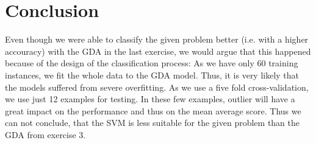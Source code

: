 \documentclass[a4paper,parskip=half-]{scrartcl}
\begin{document}
	\section{Conclusion}
	Even though we were able to classify the given problem better (i.e. with a higher accouracy) with the GDA in the last exercise, we would argue that this happened because of the design of the classification process: As we have only 60 training instances, we fit the whole data to the GDA model. Thus, it is very likely that the models suffered from severe overfitting. As we use a five fold cross-validation, we use just 12 examples for testing. In these few examples, outlier will have a great impact on the performance and thus on the mean average score. Thus we can not conclude, that the SVM is less suitable for the given problem than the GDA from exercise 3.
	
\end{document}
